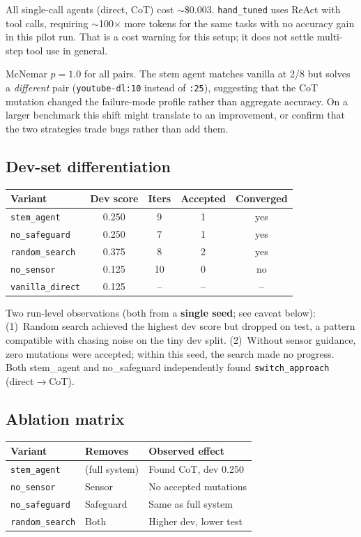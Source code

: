 \documentclass[11pt,a4paper]{article}
\begin{document}
All single-call agents (direct, CoT) cost $\sim$\$0.003.
\texttt{hand\_tuned} uses ReAct with tool calls, requiring $\sim$100$\times$ more
tokens for the same tasks with no accuracy gain in this pilot run. That is a
cost warning for this setup; it does not settle multi-step tool use in general.

McNemar $p{=}1.0$ for all pairs. The stem agent matches vanilla at 2/8 but
solves a \emph{different} pair (\texttt{youtube-dl:10} instead of
\texttt{:25}), suggesting that the CoT mutation changed the failure-mode
profile rather than aggregate accuracy. On a larger benchmark this shift might
translate to an improvement, or confirm that the two strategies trade bugs
rather than add them.

\subsection*{Dev-set differentiation}

\begin{center}\small
\begin{tabular}{lcccc}
\toprule
Variant & Dev score & Iters & Accepted & Converged \\
\midrule
\texttt{stem\_agent} & 0.250 & 9 & 1 & yes \\
\texttt{no\_safeguard} & 0.250 & 7 & 1 & yes \\
\texttt{random\_search} & 0.375 & 8 & 2 & yes \\
\texttt{no\_sensor} & 0.125 & 10 & 0 & no \\
\texttt{vanilla\_direct} & 0.125 & -- & -- & -- \\
\bottomrule
\end{tabular}
\end{center}

Two run-level observations (both from a \textbf{single seed}; see caveat below):
(1)~Random search achieved the highest dev score but dropped on test, a pattern
compatible with chasing noise on the tiny dev split.
(2)~Without sensor guidance, zero mutations were accepted; within this seed, the
search made no progress.
Both stem\_agent and no\_safeguard independently found \texttt{switch\_approach}
(direct$\to$CoT).

\subsection*{Ablation matrix}

\begin{center}\small
\begin{tabular}{lll}
\toprule
Variant & Removes & Observed effect \\
\midrule
\texttt{stem\_agent} & (full system) & Found CoT, dev 0.250 \\
\texttt{no\_sensor} & Sensor & No accepted mutations \\
\texttt{no\_safeguard} & Safeguard & Same as full system \\
\texttt{random\_search} & Both & Higher dev, lower test \\
\bottomrule
\end{tabular}
\end{center}
\end{document}
